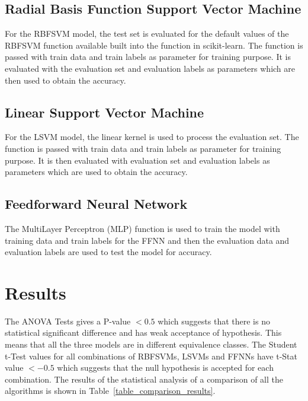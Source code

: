 \documentclass[conference]{IEEEtran}
\begin{document}
\subsection{Radial Basis Function Support Vector Machine}

For the RBFSVM model, the test set is evaluated for the default values of the RBFSVM function available built into the function in scikit-learn. The function is passed with train data and train labels as parameter for training purpose. It is evaluated with the evaluation set and evaluation labels as parameters which are then used to obtain the accuracy.

\subsection{Linear Support Vector Machine}

For the LSVM model, the linear kernel is used to process the evaluation set. The function is passed with train data and train labels as parameter for training purpose. It is then evaluated with evaluation set and evaluation labels as parameters which are used to obtain the accuracy.

\subsection{Feedforward Neural Network}

The MultiLayer Perceptron (MLP) function is used to train the model with training data and train labels for the FFNN and then the evaluation data and evaluation labels are used to test the model for accuracy.

\section{Results}

The ANOVA Tests gives a P-value \begin{math}{< 0.5}\end{math} which suggests that there is no statistical significant difference and has weak acceptance of hypothesis. This means that all the three models are in different equivalence classes. The Student t-Test values for all combinations of RBFSVMs, LSVMs and FFNNs have t-Stat value \begin{math}{< -0.5}\end{math} which suggests that the null hypothesis is accepted for each combination. The results of the statistical analysis of a comparison of all the algorithms is shown in Table~\ref{table_comparison_results}. 
\end{document}
